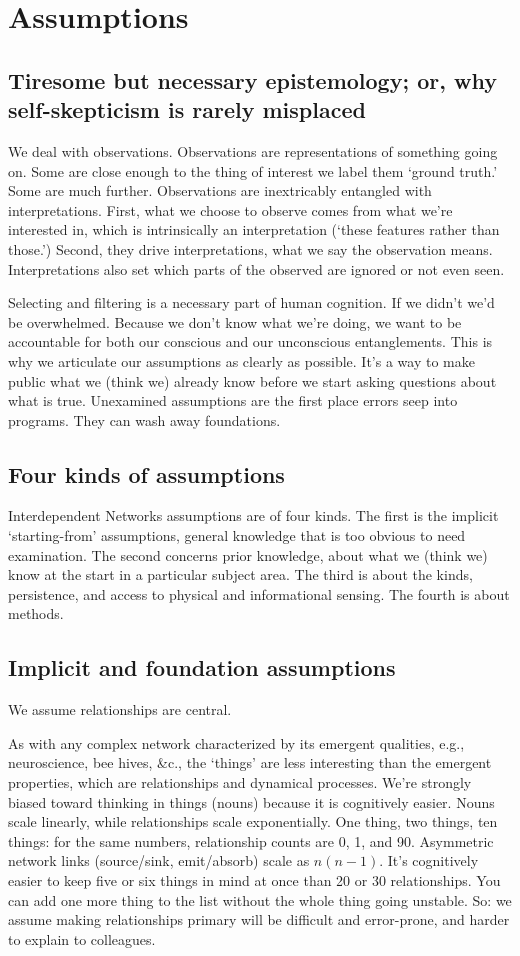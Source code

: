 \documentclass{article} %
\begin{document}
\pagebreak
\section{Assumptions}
\subsection{Tiresome but necessary epistemology; or, why self-skepticism is rarely misplaced}
We deal with observations. Observations are representations of something going on. Some are close enough to the thing of interest we label them `ground truth.' Some are much further. Observations are inextricably entangled with interpretations. First, what we choose to observe comes from what  we're interested in, which is intrinsically an interpretation (`these features rather than those.') Second, they drive interpretations, what we say the observation means. Interpretations also set which parts of the observed are ignored or not even seen. 

Selecting and filtering is a necessary part of human cognition. If we didn't we'd be overwhelmed. Because we don't know what we're doing, we want to be accountable for both our conscious and our unconscious entanglements. This is why we articulate our assumptions as clearly as possible. It's a way to make public what we (think we) already know before we start asking questions about what is true. Unexamined assumptions are the first place errors seep into programs. They can wash away foundations.

\subsection{Four kinds of assumptions}
Interdependent Networks assumptions are of four kinds. The first is the implicit `starting-from' assumptions, general knowledge that is too obvious to need examination. The second concerns prior knowledge, about what we (think we) know at the start in a particular subject area. The third is about the kinds, persistence, and access to physical and informational sensing. The fourth is about methods.

\subsection{Implicit and foundation assumptions}
We assume relationships are central. 

As with any complex network characterized by its emergent qualities, e.g., neuroscience, bee hives, \&c., the `things' are less interesting than the emergent properties, which are relationships and dynamical processes. We're strongly biased toward thinking in things (nouns) because it is cognitively easier. Nouns scale linearly, while relationships scale exponentially. One thing, two things, ten things: for the same numbers, relationship counts are 0, 1, and 90. Asymmetric network links (source/sink, emit/absorb) scale as $n(n-1)$. It's cognitively easier to keep five or six things in mind at once than 20 or 30 relationships. You can add one more thing to the list without the whole thing going unstable. So: we assume making relationships  primary will be difficult and error-prone, and harder to explain to colleagues.
\end{document}
